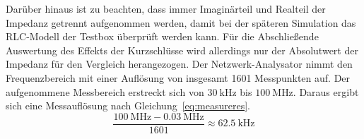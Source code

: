 Dar\"uber hinaus ist zu beachten, dass immer Imagin\"arteil und Realteil der Impedanz getrennt aufgenommen werden, damit bei der sp\"ateren Simulation das RLC-Modell der Testbox \"uberpr\"uft werden kann. F\"ur die Abschlie\ss{}ende Auswertung des Effekts der Kurzschl\"usse wird allerdings nur der Absolutwert der Impedanz f\"ur den Vergleich herangezogen. Der Netzwerk-Analysator nimmt den Frequenzbereich mit einer Aufl\"osung von insgesamt 1601 Messpunkten auf. Der aufgenommene Messbereich erstreckt sich von $\SI{30}{\kilo\hertz}$ bis $\SI{100}{\mega\hertz}$. Daraus ergibt sich eine Messaufl\"osung nach Gleichung~\ref{eq:measureres}.
\begin{equation}
	\frac{\SI{100}{\mega\hertz} - \SI{0,03}{\mega\hertz} }{1601} \approx \SI{62,5}{\kilo\hertz} 
	\label{eq:measureres}
\end{equation}


